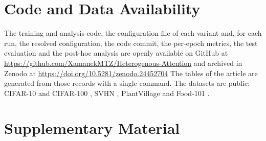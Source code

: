 \documentclass[journal]{IEEEtran}
\begin{document}
\section*{Code and Data Availability}
The training and analysis code, the configuration file of each variant and, for each run, the resolved configuration, the code commit, the per-epoch metrics, the test evaluation and the post-hoc analysis are openly available on GitHub at \url{https://github.com/XamanekMTZ/Heterogenous-Attention} and archived in Zenodo at \url{https://doi.org/10.5281/zenodo.24452704}
The tables of the article are generated from those records with a single command. The datasets are public: CIFAR-10 and CIFAR-100 \cite{krizhevsky2009learning}, SVHN \cite{netzer2011reading}, PlantVillage \cite{hughes2015plantvillage} and Food-101 \cite{bossard2014food}.




\clearpage
\section*{Supplementary Material}
\setcounter{section}{0}
\setcounter{table}{0}
\setcounter{figure}{0}

\end{document}
